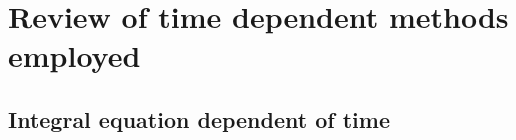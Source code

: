 \chapter{Review of time dependent methods employed}
\label{C:revi-time-depend}

\section{Integral equation dependent of time}
\label{S:integr-equat-depend}


\cite{Tong2007PRAp52711}





